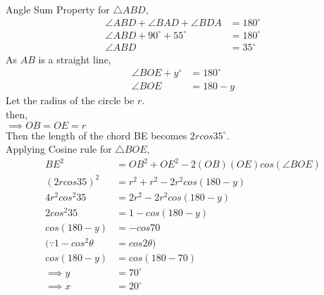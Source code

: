 \documentclass[journal,12pt,twocolumn]{IEEEtran}
\begin{document}
\begin{enumerate}[label=,ref=]
               
Angle Sum Property for $\triangle ABD$,    
\begin{align}
               \angle ABD+\angle BAD+\angle BDA&=180^\circ\\
               \angle ABD+90^\circ+55^\circ&=180^\circ\\
               \angle ABD&=35^\circ
 \end{align}  
 As $AB$ is a straight line,
 \begin{align}             
                \angle BOE+y^\circ&=180^\circ\\
                \angle BOE&=180-y
 \end{align}
                Let the radius of the circle be $r$.\\
                then,\\
               $\implies OB=OE=r$\\
                Then the length of the chord BE becomes $2rcos 35^\circ$.\\
                Applying Cosine rule for $\triangle BOE$,\\ 
              \begin{align} 
               BE^2&=OB^2+OE^2-2(OB)(OE)cos(\angle BOE)\\ 
                (2rcos 35)^2&=r^2+r^2-2r^2cos(180-y)\\ 
                4r^2cos^2 35&=2r^2 - 2r^2cos(180-y)\\ 
                2cos^2 35&=1-cos(180-y)\\ 
                cos(180-y)&=-cos 70\\
                       (\because 1-cos^2\theta&=cos 2\theta)\\ 
               cos(180-y)&=cos(180-70)\\ 
                \implies y&=70^\circ\\ 
               \implies x&=20^\circ            
            \end{align}
               
\end{enumerate}
\end{document}
